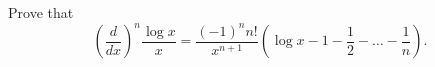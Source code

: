 Prove that
\[
\left(\frac{d}{dx}\right)^{n} \frac{\log x}{x}
  = \frac{(-1)^{n} n!}{x^{n+1}} \left(\log x - 1 - \frac{1}{2} - \dots - \frac{1}{n}\right).
\]

